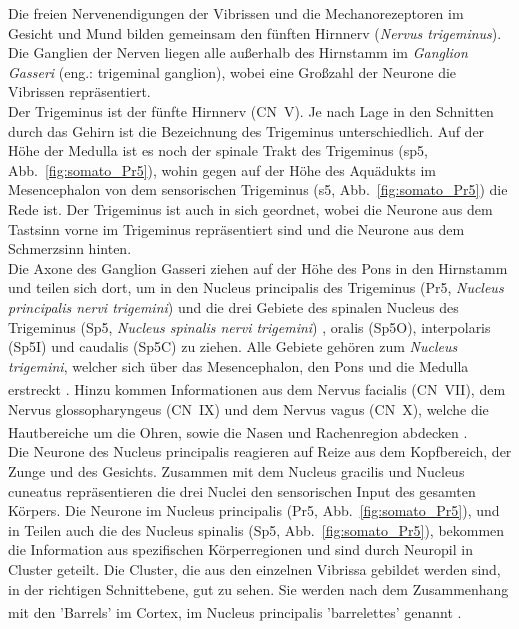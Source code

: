\documentclass[12pt,a4paper,pdftex]{article}
\begin{document}
Die freien Nervenendigungen der Vibrissen und die Mechanorezeptoren im Gesicht und Mund bilden gemeinsam den fünften Hirnnerv (\textit{Nervus trigeminus}). Die Ganglien der Nerven liegen alle außerhalb des Hirnstamm im \textit{Ganglion Gasseri} (eng.: trigeminal ganglion), wobei eine Großzahl der Neurone die Vibrissen repräsentiert.
\\
\noindent
Der Trigeminus ist der fünfte Hirnnerv (CN~V). Je nach Lage in den Schnitten durch das Gehirn ist die Bezeichnung des Trigeminus unterschiedlich. Auf der Höhe der Medulla ist es noch der spinale Trakt des Trigeminus (sp5, Abb.~\ref{fig:somato_Pr5}), wohin gegen auf der Höhe des Aquädukts im Mesencephalon von dem sensorischen Trigeminus  (s5, Abb.~\ref{fig:somato_Pr5}) die Rede ist. Der Trigeminus ist auch in sich geordnet, wobei die Neurone aus dem Tastsinn vorne im Trigeminus repräsentiert sind und die Neurone aus dem Schmerzsinn hinten.
\\
\noindent
Die Axone des Ganglion Gasseri ziehen auf der Höhe des Pons in den Hirnstamm und teilen sich dort, um in den Nucleus principalis des Trigeminus (Pr5, \textit{Nucleus principalis nervi trigemini})  und die drei Gebiete des spinalen Nucleus des Trigeminus (Sp5, \textit{Nucleus spinalis nervi trigemini}) , oralis (Sp5O), interpolaris (Sp5I) und caudalis (Sp5C) zu ziehen. Alle Gebiete gehören zum \textit{Nucleus trigemini}, welcher sich über das Mesencephalon, den Pons und die Medulla erstreckt \textsuperscript{\cite[5]{heldmaier2003tierphysiologie}}. 
Hinzu kommen Informationen aus dem Nervus facialis (CN~VII), dem Nervus glossopharyngeus  (CN~IX) und dem Nervus vagus (CN~X), welche die Hautbereiche um die Ohren, sowie die Nasen und Rachenregion abdecken
\textsuperscript{\cite[12]{neurowissenschaften_baer}}.
\\
\noindent Die Neurone des Nucleus principalis reagieren auf Reize aus dem Kopfbereich, der Zunge und des Gesichts. Zusammen mit dem Nucleus gracilis und Nucleus cuneatus repräsentieren die drei Nuclei den sensorischen Input des gesamten Körpers. Die Neurone im Nucleus principalis (Pr5, Abb.~\ref{fig:somato_Pr5}), und in Teilen auch die des Nucleus spinalis (Sp5, Abb.~\ref{fig:somato_Pr5}), bekommen die Information aus spezifischen Körperregionen und sind durch Neuropil in Cluster geteilt. Die Cluster, die aus den einzelnen Vibrissa gebildet werden sind, in der richtigen Schnittebene, gut zu sehen. Sie werden nach dem Zusammenhang mit den 'Barrels' im Cortex, im Nucleus principalis 'barrelettes' genannt \textsuperscript{\cite[5]{heldmaier2003tierphysiologie}}.
\end{document}
